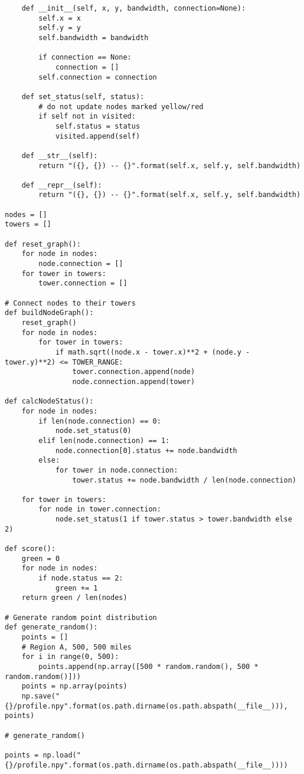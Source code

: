 \begin{singlespace}
\begin{verbatim}
    def __init__(self, x, y, bandwidth, connection=None):
        self.x = x
        self.y = y
        self.bandwidth = bandwidth
        
        if connection == None:
            connection = []
        self.connection = connection
    
    def set_status(self, status):
        # do not update nodes marked yellow/red
        if self not in visited:
            self.status = status
            visited.append(self)
 
    def __str__(self):
        return "({}, {}) -- {}".format(self.x, self.y, self.bandwidth)
 
    def __repr__(self):
        return "({}, {}) -- {}".format(self.x, self.y, self.bandwidth)
 
nodes = []
towers = []
 
def reset_graph():
    for node in nodes:
        node.connection = []
    for tower in towers:
        tower.connection = []
 
# Connect nodes to their towers
def buildNodeGraph():
    reset_graph()
    for node in nodes:
        for tower in towers:
            if math.sqrt((node.x - tower.x)**2 + (node.y - tower.y)**2) <= TOWER_RANGE:
                tower.connection.append(node)
                node.connection.append(tower)
 
def calcNodeStatus():
    for node in nodes:
        if len(node.connection) == 0:
            node.set_status(0)
        elif len(node.connection) == 1:
            node.connection[0].status += node.bandwidth
        else:
            for tower in node.connection:
                tower.status += node.bandwidth / len(node.connection)
    
    for tower in towers:
        for node in tower.connection:
            node.set_status(1 if tower.status > tower.bandwidth else 2)
 
def score():
    green = 0
    for node in nodes:
        if node.status == 2:
            green += 1
    return green / len(nodes)
 
# Generate random point distribution
def generate_random():
    points = []
    # Region A, 500, 500 miles
    for i in range(0, 500):
        points.append(np.array([500 * random.random(), 500 * random.random()]))
    points = np.array(points)
    np.save("{}/profile.npy".format(os.path.dirname(os.path.abspath(__file__))), points)
 
# generate_random()
 
points = np.load("{}/profile.npy".format(os.path.dirname(os.path.abspath(__file__))))
 

\end{verbatim}
\end{singlespace}

